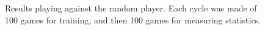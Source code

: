 \begin{figure}[!htb]
\centering
{}


\caption{Results playing against the random player. Each cycle was made of 100 games for training, and then 100 games for measuring statistics.
\label{fig:ttt-results-random}
}
\end{figure}

